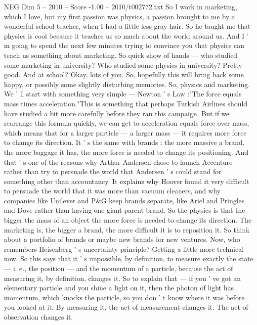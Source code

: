 \begin{textsample}{NEG Dim 5 – 2010 – Score -1.00 – 2010/t002772.txt}  \label{ex:f5_neg_053}
So I work in marketing, which I love, but my first passion was physics, a passion brought to me by a wonderful school teacher, when I had a little less gray hair.
So he taught me that physics is cool because it teaches us so much about the world around us.
And I ' m going to spend the next few minutes trying to convince you that physics can teach us something about marketing.
So quick show of hands — who studied some marketing in university?
Who studied some physics in university?
Pretty good.
And at school?
Okay, lots of you.
So, hopefully this will bring back some happy, or possibly some slightly disturbing memories.
So, physics and marketing.
We ' ll start with something very simple — Newton ' s Law :"The force equals mass times acceleration."This is something that perhaps Turkish Airlines should have studied a bit more carefully before they ran this campaign.
But if we rearrange this formula quickly, we can get to acceleration equals force over mass, which means that for a larger particle — a larger mass — it requires more force to change its direction.
It ' s the same with brands : the more massive a brand, the more baggage it has, the more force is needed to change its positioning.
And that ' s one of the reasons why Arthur Andersen chose to launch Accenture rather than try to persuade the world that Andersen ' s could stand for something other than accountancy.
It explains why Hoover found it very difficult to persuade the world that it was more than vacuum cleaners, and why companies like Unilever and P\&G keep brands separate, like Ariel and Pringles and Dove rather than having one giant parent brand.
So the physics is that the bigger the mass of an object the more force is needed to change its direction.
The marketing is, the bigger a brand, the more difficult it is to reposition it.
So think about a portfolio of brands or maybe new brands for new ventures.
Now, who remembers Heisenberg ' s uncertainty principle?
Getting a little more technical now.
So this says that it ' s impossible, by definition, to measure exactly the state — i. e., the position — and the momentum of a particle, because the act of measuring it, by definition, changes it.
So to explain that — if you ' ve got an elementary particle and you shine a light on it, then the photon of light has momentum, which knocks the particle, so you don ' t know where it was before you looked at it.
By measuring it, the act of measurement changes it.
The act of observation changes it.

\end{textsample}
